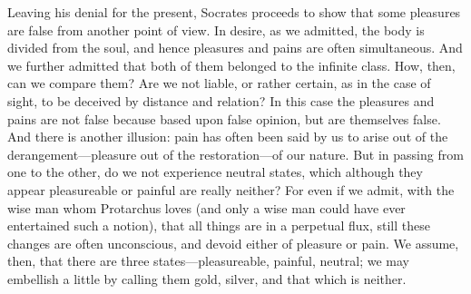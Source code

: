 \documentclass[11pt,letter]{article}
\begin{document}
\par  Leaving his denial for the present, Socrates proceeds to show that some pleasures are false from another point of view. In desire, as we admitted, the body is divided from the soul, and hence pleasures and pains are often simultaneous. And we further admitted that both of them belonged to the infinite class. How, then, can we compare them? Are we not liable, or rather certain, as in the case of sight, to be deceived by distance and relation? In this case the pleasures and pains are not false because based upon false opinion, but are themselves false. And there is another illusion: pain has often been said by us to arise out of the derangement—pleasure out of the restoration—of our nature. But in passing from one to the other, do we not experience neutral states, which although they appear pleasureable or painful are really neither? For even if we admit, with the wise man whom Protarchus loves (and only a wise man could have ever entertained such a notion), that all things are in a perpetual flux, still these changes are often unconscious, and devoid either of pleasure or pain. We assume, then, that there are three states—pleasureable, painful, neutral; we may embellish a little by calling them gold, silver, and that which is neither.
\end{document}
